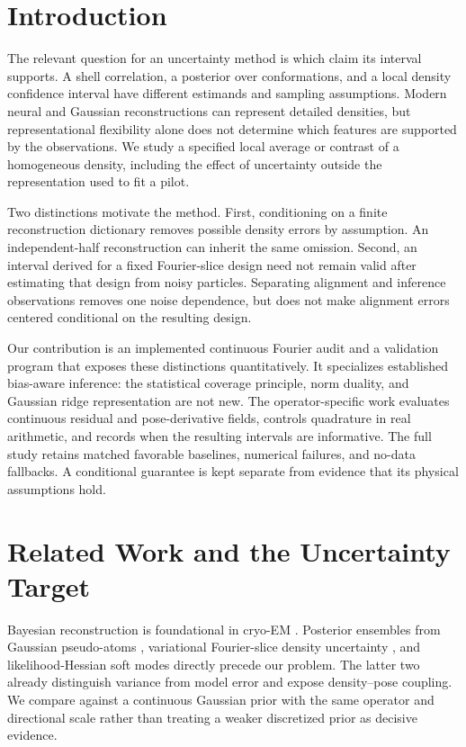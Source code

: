 \documentclass{article}
\begin{document}
\section{Introduction}
The relevant question for an uncertainty method is which claim its interval supports. A shell correlation, a posterior over conformations, and a local density confidence interval have different estimands and sampling assumptions. Modern neural and Gaussian reconstructions can represent detailed densities, but representational flexibility alone does not determine which features are supported by the observations. We study a specified local average or contrast of a homogeneous density, including the effect of uncertainty outside the representation used to fit a pilot.

Two distinctions motivate the method. First, conditioning on a finite reconstruction dictionary removes possible density errors by assumption. An independent-half reconstruction can inherit the same omission. Second, an interval derived for a fixed Fourier-slice design need not remain valid after estimating that design from noisy particles. Separating alignment and inference observations removes one noise dependence, but does not make alignment errors centered conditional on the resulting design.

Our contribution is an implemented continuous Fourier audit and a validation program that exposes these distinctions quantitatively. It specializes established bias-aware inference: the statistical coverage principle, norm duality, and Gaussian ridge representation are not new. The operator-specific work evaluates continuous residual and pose-derivative fields, controls quadrature in real arithmetic, and records when the resulting intervals are informative. The full study retains matched favorable baselines, numerical failures, and no-data fallbacks. A conditional guarantee is kept separate from evidence that its physical assumptions hold.

\section{Related Work and the Uncertainty Target}
Bayesian reconstruction is foundational in cryo-EM \citep{scheres2012}. Posterior ensembles from Gaussian pseudo-atoms \citep{joubert2015}, variational Fourier-slice density uncertainty \citep{ullrich2020}, and likelihood-Hessian soft modes \citep{rangan2024} directly precede our problem. The latter two already distinguish variance from model error and expose density--pose coupling. We compare against a continuous Gaussian prior with the same operator and directional scale rather than treating a weaker discretized prior as decisive evidence.
\end{document}
